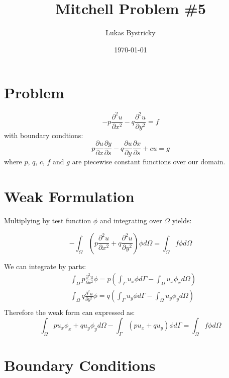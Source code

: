 \documentclass[a4paper]{article}
\begin{document}
\title{Mitchell Problem \#5}
\author{Lukas Bystricky} \date{\today} \maketitle

\section{Problem}

\[ -p \frac{\partial^2 u}{\partial x^2} - q \frac{\partial^2 u}{\partial y^2} = f\]
with boundary condtions:
\[p \frac{\partial u}{\partial x}\frac{\partial y}{\partial s} - q\frac{\partial u}{\partial y}\frac{\partial x}{\partial s} + c u = g\]
where $p$, $q$, $c$, $f$ and $g$ are piecewise constant functions over our domain.

\section{Weak Formulation}

Multiplying by test function $\phi$ and integrating over $\Omega$ yields:

\[-\int_\Omega \left(p\frac{\partial^2 u}{\partial x^2} + q \frac{\partial^2 u}{\partial y^2}\right)\phi d\Omega = \int_\Omega f\phi d\Omega\]

We can integrate by parts:
\begin{align*}
	&\int_\Omega p\frac{\partial^2 u}{\partial x^2}\phi = p\left(\int_\Gamma u_x\phi d\Gamma - \int_\Omega u_x	\phi_x d\Omega\right)\\
	&\int _\Omega q\frac{\partial^2 u}{\partial y^2}\phi = q\left(\int_\Gamma u_y\phi d\Gamma - \int_\Omega u_y\phi_y d\Omega\right)\\
\end{align*}
Therefore the weak form can expressed as:
\[\int_\Omega p u_x\phi_x + q u_y\phi_y d\Omega - \int_\Gamma \left(p u_x + q u_y\right)\phi d\Gamma = \int_\Omega f \phi d\Omega\] 

\section{Boundary Conditions}
\end{document}
